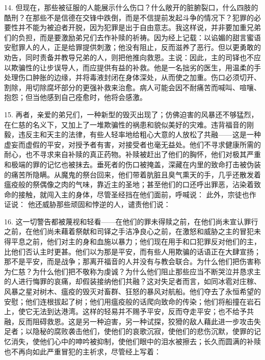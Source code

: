 14. 但现在，那些被征服的人能展示什么伤口？什么敞开的脏腑裂口，什么四肢的酷刑？在那些不是信德在交锋中跌倒，而是不信提前发起斗争的情况下？犯罪的必要性并不能为被迫者开脱，因为犯罪是出于自由意志。我这样说，并非要加重兄弟们的负担，而是要激励弟兄们去作补赎的祈祷。因为经上记载：以谄媚的甜言蜜语安慰罪人的人，正是给罪提供刺激；他没有阻止，反而滋养了恶行。但以更勇敢的劝告，同时责备并教导兄弟的人，则把他推向救恩。主说：因此，主的司铎也不应以欺骗性的让步误导人，而应提供有益的补救。他是一名拙劣的医生，用温柔的手处理伤口肿胀的边缘，并将毒液封闭在身体深处，从而使之加重。伤口必须切开、割除，用切除腐坏部分的更强补救来治愈。病人可能会因不耐痛苦而喊叫、喧嚷、抱怨；但当他感到自己痊愈时，他将会感激。\par

15. 再者，亲爱的弟兄们，一种新型的毁灭出现了；仿佛迫害的风暴还不够猛烈，在仁慈的名义下，又加上了一堆欺骗性的祸患和貌似美好的灾难。违背福音的刚毅，违反主和天主的法律，有些人轻率地给粗心大意的人放松了共融——这是一种虚妄而虚假的平安，对授予者有害，对接受者也毫无益处。他们不寻求健康所需的耐心，也不寻求来自补赎的真正药物。补赎被赶出了他们的胸怀，他们对极其严重和极端的罪的记忆也被抹去。垂死者的伤口被掩盖，深藏在内里的致命打击被伪装的痛苦所隐瞒。从魔鬼的祭台回来，他们带着肮脏且臭气熏天的手，几乎还散发着瘟疫般的祭偶像之肉的气味，靠近主的圣地；甚至他们的口还呼出罪恶，沾染着致命的接触，就闯入主的身体，尽管圣经挡在他们面前，呼喊说： 此外，宗徒也作证说： 他还威胁那些顽固和悖逆的人，谴责他们说：\par

16. 这一切警告都被蔑视和轻看——在他们的罪未得赎之前，在他们尚未宣认罪行之前，在他们尚未藉着祭献和司铎之手洁净良心之前，在激怒和威胁之主的冒犯未得平息之前，他们对主的身和血施以暴力；他们现在用手和口犯罪反对他们的主，比他们否认主时更甚。他们以为那是平安，而有些人用欺骗的话语正在大肆宣扬；那不是平安，而是战争；那离开福音的人并没有与教会联合。为什么他们把伤害称为仁慈？为什么他们把不敬称为虔诚？为什么他们阻止那些应当不断哭泣并恳求主的人进行悔罪的哀痛，却假装接纳他们共融？这对失足者而言，如同冰雹对庄稼、风暴之星对树木、瘟疫的毁灭对畜群、狂怒的暴风对航船。他们夺去了永恒希望的安慰；他们连根拔起了树；他们用瘟疫般的话爬向致命的传染；他们将船撞在岩石上，使它无法到达港湾。这样的轻易并不赐予平安，反而夺走平安；也不给予共融，反而阻碍救恩。这是另一种迫害，另一种试探，狡猾的敌人藉此进一步攻击失足者；以隐秘的腐败袭击他们，使他们的哀歌沉寂，使他们的悲伤沉默，使罪的记忆消失，使他们心中的呻吟被抑制，使他们眼中的泪水被擦去；长久而圆满的补赎也不再向如此严重冒犯的主祈求，尽管经上写着：\par

